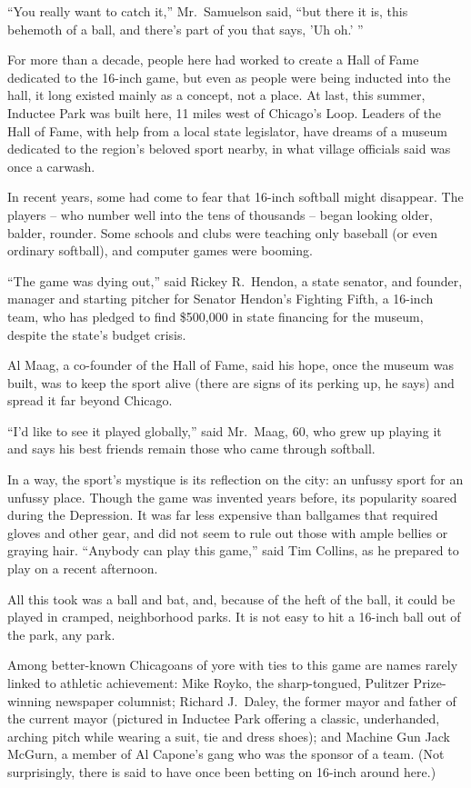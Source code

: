 ﻿\documentclass[12pt]{article}
\begin{document}
``You really want to catch it,'' Mr.~Samuelson said, ``but there it is, this behemoth of a ball, and
there's part of you that says, 'Uh oh.' ''

For more than a decade, people here had worked to create a Hall of Fame dedicated to the 16-inch
game, but even as people were being inducted into the hall, it long existed mainly as a concept, not
a place. At last, this summer, Inductee Park was built here, 11 miles west of Chicago's Loop.
Leaders of the Hall of Fame, with help from a local state legislator, have dreams of a museum
dedicated to the region's beloved sport nearby, in what village officials said was once a carwash.

In recent years, some had come to fear that 16-inch softball might disappear. The players -- who
number well into the tens of thousands -- began looking older, balder, rounder. Some schools and
clubs were teaching only baseball (or even ordinary softball), and computer games were booming.

``The game was dying out,'' said Rickey R.~Hendon, a state senator, and founder, manager and
starting pitcher for Senator Hendon's Fighting Fifth, a 16-inch team, who has pledged to find
\$500,000 in state financing for the museum, despite the state's budget crisis.

Al Maag, a co-founder of the Hall of Fame, said his hope, once the museum was built, was to keep the
sport alive (there are signs of its perking up, he says) and spread it far beyond Chicago.

``I'd like to see it played globally,'' said Mr.~Maag, 60, who grew up playing it and says his best
friends remain those who came through softball.

In a way, the sport's mystique is its reflection on the city: an unfussy sport for an unfussy place.
Though the game was invented years before, its popularity soared during the Depression. It was far
less expensive than ballgames that required gloves and other gear, and did not seem to rule out
those with ample bellies or graying hair. ``Anybody can play this game,'' said Tim Collins, as he
prepared to play on a recent afternoon.

All this took was a ball and bat, and, because of the heft of the ball, it could be played in
cramped, neighborhood parks. It is not easy to hit a 16-inch ball out of the park, any park.

Among better-known Chicagoans of yore with ties to this game are names rarely linked to athletic
achievement: Mike Royko, the sharp-tongued, Pulitzer Prize-winning newspaper columnist; Richard
J.~Daley, the former mayor and father of the current mayor (pictured in Inductee Park offering a
classic, underhanded, arching pitch while wearing a suit, tie and dress shoes); and Machine Gun Jack
McGurn, a member of Al Capone's gang who was the sponsor of a team. (Not surprisingly, there is said
to have once been betting on 16-inch around here.)
\end{document}
